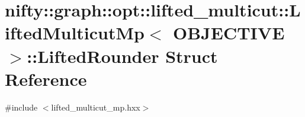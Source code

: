 \hypertarget{structnifty_1_1graph_1_1opt_1_1lifted__multicut_1_1LiftedMulticutMp_1_1LiftedRounder}{}\section{nifty\+:\+:graph\+:\+:opt\+:\+:lifted\+\_\+multicut\+:\+:Lifted\+Multicut\+Mp$<$ O\+B\+J\+E\+C\+T\+I\+VE $>$\+:\+:Lifted\+Rounder Struct Reference}
\label{structnifty_1_1graph_1_1opt_1_1lifted__multicut_1_1LiftedMulticutMp_1_1LiftedRounder}


{\ttfamily \#include $<$lifted\+\_\+multicut\+\_\+mp.\+hxx$>$}

